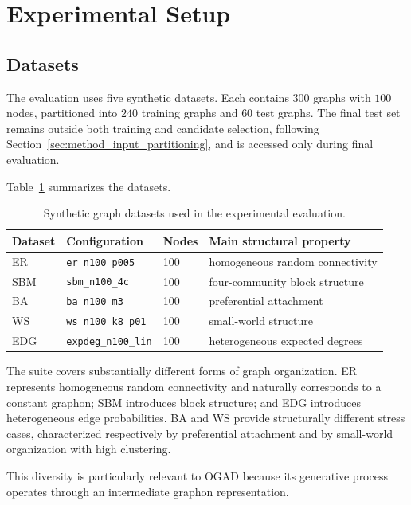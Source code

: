 \section{Experimental Setup}
\label{sec:exp_setup}

\subsection{Datasets}
\label{subsec:exp_datasets}

The evaluation uses five synthetic datasets. Each contains \(300\) graphs with \(100\) nodes, partitioned into \(240\) training graphs and \(60\) test graphs. The final test set remains outside both training and candidate selection, following Section~\ref{sec:method_input_partitioning}, and is accessed only during final evaluation.

Table~\ref{tab:exp_datasets} summarizes the datasets.

\begin{table}[htbp]
    \centering
    \caption{Synthetic graph datasets used in the experimental evaluation.}
    \label{tab:exp_datasets}
    \begin{tabular}{llll}
        \hline
        Dataset & Configuration & Nodes & Main structural property \\
        \hline
        ER  & \texttt{er\_n100\_p005}     & 100 & homogeneous random connectivity \\
        SBM & \texttt{sbm\_n100\_4c}      & 100 & four-community block structure \\
        BA  & \texttt{ba\_n100\_m3}       & 100 & preferential attachment \\
        WS  & \texttt{ws\_n100\_k8\_p01} & 100 & small-world structure \\
        EDG & \texttt{expdeg\_n100\_lin}  & 100 & heterogeneous expected degrees \\
        \hline
    \end{tabular}
\end{table}

The suite covers substantially different forms of graph organization. ER represents homogeneous random connectivity and naturally corresponds to a constant graphon; SBM introduces block structure; and EDG introduces heterogeneous edge probabilities. BA and WS provide structurally different stress cases, characterized respectively by preferential attachment and by small-world organization with high clustering.

This diversity is particularly relevant to OGAD because its generative process operates through an intermediate graphon representation.


